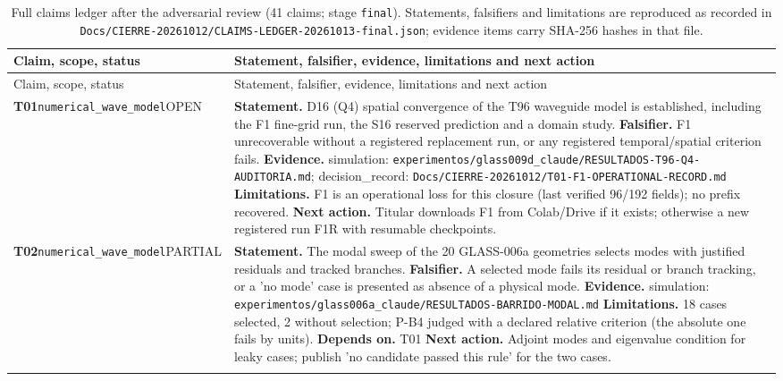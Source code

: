 \begin{longtable}{@{}>{\raggedright\arraybackslash}p{2.35cm}>{\raggedright\arraybackslash}p{13.2cm}@{}}
\caption{Full claims ledger after the adversarial review (41 claims; stage \texttt{final}). Statements, falsifiers and limitations are reproduced as recorded in \texttt{Docs/CIERRE-20261012/CLAIMS-LEDGER-20261013-final.json}; evidence items carry SHA-256 hashes in that file.}\label{tab:claims}\\
\toprule Claim, scope, status & Statement, falsifier, evidence, limitations and next action \\ \midrule \endfirsthead
\toprule Claim, scope, status & Statement, falsifier, evidence, limitations and next action \\ \midrule \endhead
\bottomrule \endfoot
\textbf{T01}\newline \texttt{numerical\_\allowbreak{}wave\_\allowbreak{}model}\newline OPEN & \textbf{Statement.} D16 (Q4) spatial convergence of the T96 waveguide model is established, including the F1 fine-grid run, the S16 reserved prediction and a domain study. \newline \textbf{Falsifier.} F1 unrecoverable without a registered replacement run, or any registered temporal/\allowbreak{}spatial criterion fails. \newline \textbf{Evidence.} simulation: \texttt{experimentos/\allowbreak{}glass009d\_\allowbreak{}claude/\allowbreak{}RESULTADOS-T96-Q4-AUDITORIA.md}; decision\_\allowbreak{}record: \texttt{Docs/\allowbreak{}CIERRE-20261012/\allowbreak{}T01-F1-OPERATIONAL-RECORD.md} \newline \textbf{Limitations.} F1 is an operational loss for this closure (last verified 96/\allowbreak{}192 fields); no prefix recovered. \newline \textbf{Next action.} Titular downloads F1 from Colab/\allowbreak{}Drive if it exists; otherwise a new registered run F1R with resumable checkpoints. \\ \addlinespace[2pt]
\textbf{T02}\newline \texttt{numerical\_\allowbreak{}wave\_\allowbreak{}model}\newline PARTIAL & \textbf{Statement.} The modal sweep of the 20 GLASS-006a geometries selects modes with justified residuals and tracked branches. \newline \textbf{Falsifier.} A selected mode fails its residual or branch tracking, or a 'no mode' case is presented as absence of a physical mode. \newline \textbf{Evidence.} simulation: \texttt{experimentos/\allowbreak{}glass006a\_\allowbreak{}claude/\allowbreak{}RESULTADOS-BARRIDO-MODAL.md} \newline \textbf{Limitations.} 18 cases selected, 2 without selection; P-B4 judged with a declared relative criterion (the absolute one fails by units). \newline \textbf{Depends on.} T01 \newline \textbf{Next action.} Adjoint modes and eigenvalue condition for leaky cases; publish 'no candidate passed this rule' for the two cases. \\ \addlinespace[2pt]

\end{longtable}
